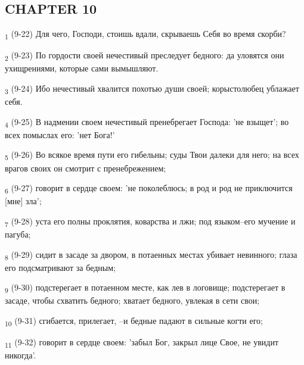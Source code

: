 \subsection{CHAPTER 10}
\begin{tcolorbox}
\textsubscript{1} (9-22) Для чего, Господи, стоишь вдали, скрываешь Себя во время скорби?
\end{tcolorbox}
\begin{tcolorbox}
\textsubscript{2} (9-23) По гордости своей нечестивый преследует бедного: да уловятся они ухищрениями, которые сами вымышляют.
\end{tcolorbox}
\begin{tcolorbox}
\textsubscript{3} (9-24) Ибо нечестивый хвалится похотью души своей; корыстолюбец ублажает себя.
\end{tcolorbox}
\begin{tcolorbox}
\textsubscript{4} (9-25) В надмении своем нечестивый пренебрегает Господа: 'не взыщет'; во всех помыслах его: 'нет Бога!'
\end{tcolorbox}
\begin{tcolorbox}
\textsubscript{5} (9-26) Во всякое время пути его гибельны; суды Твои далеки для него; на всех врагов своих он смотрит с пренебрежением;
\end{tcolorbox}
\begin{tcolorbox}
\textsubscript{6} (9-27) говорит в сердце своем: 'не поколеблюсь; в род и род не приключится [мне] зла';
\end{tcolorbox}
\begin{tcolorbox}
\textsubscript{7} (9-28) уста его полны проклятия, коварства и лжи; под языком--его мучение и пагуба;
\end{tcolorbox}
\begin{tcolorbox}
\textsubscript{8} (9-29) сидит в засаде за двором, в потаенных местах убивает невинного; глаза его подсматривают за бедным;
\end{tcolorbox}
\begin{tcolorbox}
\textsubscript{9} (9-30) подстерегает в потаенном месте, как лев в логовище; подстерегает в засаде, чтобы схватить бедного; хватает бедного, увлекая в сети свои;
\end{tcolorbox}
\begin{tcolorbox}
\textsubscript{10} (9-31) сгибается, прилегает, --и бедные падают в сильные когти его;
\end{tcolorbox}
\begin{tcolorbox}
\textsubscript{11} (9-32) говорит в сердце своем: 'забыл Бог, закрыл лице Свое, не увидит никогда'.
\end{tcolorbox}

